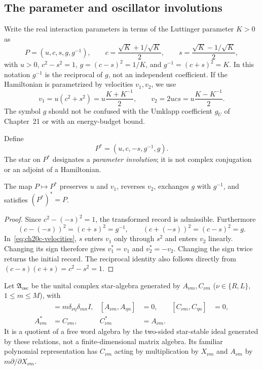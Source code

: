 \subsection{The parameter and oscillator involutions}
\label{subsec:ch20c-oscillators}

Write the real interaction parameters in terms of the Luttinger parameter $K > 0$ as
\begin{equation}
 P=(u,c,s,g,g^{-1}),\qquad
 c=\frac{\sqrt{K}+1/\sqrt{K}}{2},\qquad s=\frac{\sqrt{K}-1/\sqrt{K}}{2},
 \label{eq:ch20c-params}
\end{equation}
with $u>0$, $c^2-s^2=1$, $g=(c-s)^2=1/K$, and $g^{-1}=(c+s)^2=K$.
In this notation $g^{-1}$ is the reciprocal of $g$, not an independent coefficient.
If the Hamiltonian is parametrized by velocities $v_1,v_2$, we use
\begin{equation}
 v_1=u(c^2+s^2)=u\frac{K+K^{-1}}{2},\qquad v_2=2ucs=u\frac{K-K^{-1}}{2}.
 \label{eq:ch20c-velocities}
\end{equation}
The symbol $g$ should not be confused with the Umklapp coefficient
$g_U$ of Chapter~21 or with an energy-budget bound.

\begin{definition}
\label{def:ch20c-param}
Define
\begin{equation}
 P^*=(u,c,-s,g^{-1},g).
 \label{eq:ch20c-Pstar}
\end{equation}
The star on $P^*$ designates a \emph{parameter involution}; it is
not complex conjugation or an adjoint of a Hamiltonian.
\end{definition}

\begin{lemma}
\label{lem:ch20c-param}
The map $P\mapsto P^*$ preserves $u$ and $v_1$, reverses $v_2$,
exchanges $g$ with $g^{-1}$, and satisfies $(P^*)^*=P$.
\end{lemma}
\begin{proof}
Since $c^2-(-s)^2=1$, the transformed record is admissible.
Furthermore
\[
 (c-(-s))^2=(c+s)^2=g^{-1},\qquad
 (c+(-s))^2=(c-s)^2=g.
\]
In~\eqref{eq:ch20c-velocities}, $s$ enters $v_1$ only through
$s^2$ and enters $v_2$ linearly.  Changing its sign therefore gives
$v_1^*=v_1$ and $v_2^*=-v_2$.  Changing the sign twice returns the
initial record.  The reciprocal identity also follows directly from
$(c-s)(c+s)=c^2-s^2=1$.
\end{proof}

Let $\mathfrak A_{\mathrm{osc}}$ be the unital complex star-algebra
generated by $A_{\nu m},C_{\nu m}$ ($\nu\in\{R,L\}$,
$1\leq m\leq M$), with
\begin{align}
 [A_{\nu m},C_{\eta n}]&=m\delta_{\nu\eta}\delta_{mn}I,
 & [A_{\nu m},A_{\eta n}]&=0,
 & [C_{\nu m},C_{\eta n}]&=0,\nonumber\\
 A_{\nu m}^*&=C_{\nu m},& C_{\nu m}^*&=A_{\nu m}.
 \label{eq:ch20c-ccr}
\end{align}
It is a quotient of a free word algebra by the two-sided star-stable
ideal generated by these relations, not a finite-dimensional matrix
algebra.  Its familiar polynomial representation has $C_{\nu m}$
acting by multiplication by $X_{\nu m}$ and $A_{\nu m}$ by
$m\partial/\partial X_{\nu m}$.

